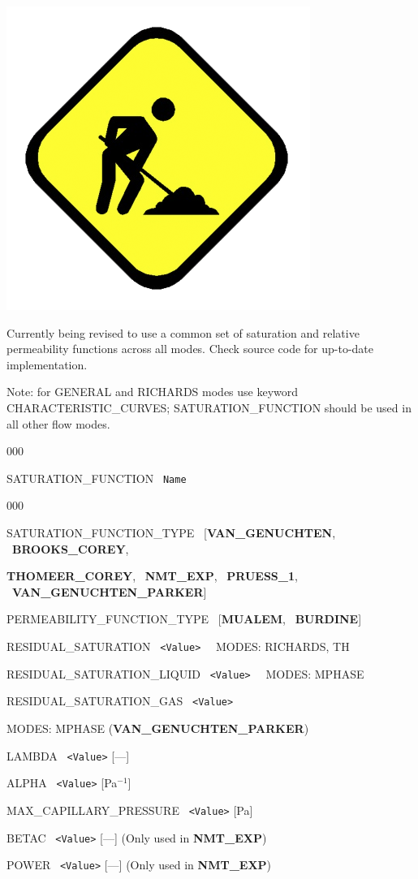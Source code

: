 \hfill\hyperlink{target_key}{\return}

\includegraphics[scale=0.25]{./figs/under-construction.png}

 Currently being revised to use a common set of saturation and relative permeability functions across all modes. Check source code for up-to-date implementation.

Note: for GENERAL and RICHARDS modes use keyword CHARACTERISTIC\_CURVES; SATURATION\_FUNCTION should be used in all other flow modes.

\begin{deflist}{000}
\item[SATURATION\_FUNCTION] \ {\tt Name}

\begin{deflist}{000}
\item[SATURATION\_FUNCTION\_TYPE] \ [{\bf VAN\_GENUCHTEN}, \ {\bf BROOKS\_COREY}, 

{\bf THOMEER\_COREY}, \ {\bf NMT\_EXP}, \ {\bf PRUESS\_1}, \ {\bf VAN\_GENUCHTEN\_PARKER}]

\item[PERMEABILITY\_FUNCTION\_TYPE] \ [{\bf MUALEM}, \ {\bf BURDINE}]
\item[RESIDUAL\_SATURATION] \ {\tt <Value>} \ \ MODES: RICHARDS, TH
\item[RESIDUAL\_SATURATION\_LIQUID] \ {\tt <Value>} \ \ MODES: MPHASE
\item[RESIDUAL\_SATURATION\_GAS] \ {\tt <Value>} 

MODES: MPHASE ({\bf VAN\_GENUCHTEN\_PARKER})

\item[LAMBDA] \ {\tt <Value>} [---]
\item[ALPHA] \ {\tt <Value>} [Pa$^{-1}$]
\item[MAX\_CAPILLARY\_PRESSURE] \ {\tt <Value>} [Pa]
\item[BETAC] \ {\tt <Value>} [---] (Only used in {\bf NMT\_EXP})
\item[POWER] \ {\tt <Value>} [---] (Only used in {\bf NMT\_EXP})
\end{deflist}
\item[\keyend]
\end{deflist}


